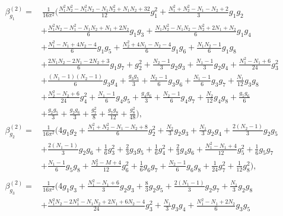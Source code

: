 \begin{subappendices}
\begingroup
\allowdisplaybreaks
\begin{align}
\beta_{g_1}^{(2)}
=&\,
\frac{1}{16\pi^2}
\bigg(
 \frac{N_1^2 N_2^2 - N_1^2 N_2 - N_1 N_2^2+ N_1 N_2 +32}{12} g_1^2
  + \frac{ N_1^2+ N_2^2- N_1 - N_2 +2}{3} g_1 g_2 
   \nonumber\\ &
  + \frac{N_1^2 N_2- N_1^2 - N_1 N_2+ N_1 + 2 N_2 }{6} g_1 g_3
  +  \frac{N_1 N_2^2- N_1 N_2 - N_2^2+2 N_1 + N_2  }{6} g_1 g_4 
   \nonumber\\ &
  + \frac{N_1^2-N_1 + 4 N_2-4}{6}g_1 g_5
  +  \frac{N_2^2 + 4 N_1 - N_2 -4}{6} g_1 g_6 
  + \frac{N_1 N_2-1}{6} g_1 g_8 
     \nonumber\\ &
  +  \frac{2 N_1 N_2-2N_1-2N_2+3}{6}g_1 g_7
  + g_2^2 
  + \frac{N_2-1}{3} g_2 g_3
  + \frac{N_1-1}{3} g_2 g_4 
  + \frac{N_1^2-N_1+6}{24} g_3^2
       \nonumber\\ &
  + \frac{(N_1-1)(N_2-1)}{6} g_3 g_4 
  + \frac{g_3 g_5}{3}
  + \frac{N_2-1}{6} g_3 g_6  
  + \frac{N_1-1}{6} g_3 g_7
  + \frac{N_1}{12}g_3 g_8
       \nonumber\\ &
 +  \frac{N_2^2- N_2 +6}{24} g_4^2 
  + \frac{N_1-1}{6} g_4 g_5 
  + \frac{g_4 g_6}{3} 
  + \frac{N_2-1}{6} g_4 g_7
  + \frac{N_2}{12}g_4 g_8
    + \frac{g_5 g_6}{6} 
           \nonumber\\ &
  + \frac{g_2 g_5}{3} 
  + \frac{g_2 g_6}{3}  
  + \frac{g_7^2}{8} 
  + \frac{g_7 g_8}{12} 
  + \frac{g_8^2}{48}
\bigg), \label{eq:beta1} \\
\beta_{g_2}^{(2)}
=&\,
\frac{1}{16\pi^2}
\bigg(
4 g_1 g_2 
+ \frac{N_1^2+N_2^2-N_1-N_2+8}{6} g_2^2
+ \frac{N_2}{3}g_2 g_3  
+ \frac{N_1}{3}g_2 g_4  
+ \frac{2(N_2-1)}{3} g_2 g_5  
  \nonumber\\ &
+ \frac{2(N_1-1)}{3} g_2 g_6  
+ \frac{1}{6}g_3^2 
+ \frac{2}{3} g_3 g_5 
+ \frac{1}{6}g_4^2 
+ \frac{2}{3} g_4 g_6
+ \frac{N_1^2-N_1+4}{12} g_5^2 
+ \frac{1}{6}g_5 g_7 
  \nonumber\\ &
+ \frac{N_1-1}{6} g_5 g_8
+ \frac{N_2^2-M+4}{12} g_6^2 
+ \frac{1}{6}g_6 g_7 
+ \frac{N_2-1}{6} g_6 g_8 
+ \frac{1}{24}g_7^2 
+ \frac{1}{12}g_8^2 
\bigg),
\\ \nonumber
\\
\beta_{g_3}^{(2)}
=&\,
\frac{1}{16\pi^2}
\bigg(
4 g_1 g_3 
+ \frac{N_1^2-N_1+6}{3} g_2 g_3 
+ \frac{8}{3} g_2 g_5 
+ \frac{2(N_1-1)}{3} g_2 g_7 
+ \frac{N_1}{3}g_2 g_8  
  \nonumber\\ &
+ \frac{N_1^2 N_2-2N_1^2-N_1 N_2+2N_1+6 N_2-4}{24} g_3^2 
+ \frac{N_1}{3}g_3 g_4  
+ \frac{N_1^2-N_1+2 N_2}{6} g_3 g_5  
  \nonumber\\ &

\end{align}
\end{subappendices}
